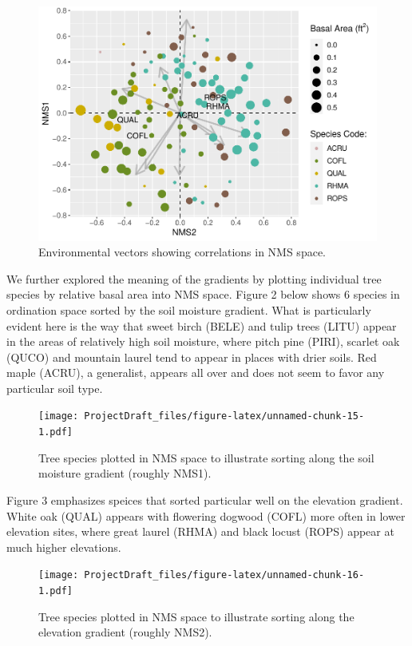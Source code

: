 \documentclass[
  12pt,
]{article}
\begin{document}
\begin{figure}
\centering
\includegraphics{ProjectDraft_files/figure-latex/unnamed-chunk-14-1.pdf}
\caption{Environmental vectors showing correlations in NMS space.}
\end{figure}

We further explored the meaning of the gradients by plotting individual
tree species by relative basal area into NMS space. Figure 2 below shows
6 species in ordination space sorted by the soil moisture gradient. What
is particularly evident here is the way that sweet birch (BELE) and
tulip trees (LITU) appear in the areas of relatively high soil moisture,
where pitch pine (PIRI), scarlet oak (QUCO) and mountain laurel tend to
appear in places with drier soils. Red maple (ACRU), a generalist,
appears all over and does not seem to favor any particular soil type.

\begin{figure}
\centering
\texttt{[image: ProjectDraft\_files/figure-latex/unnamed-chunk-15-1.pdf]}
\caption{Tree species plotted in NMS space to illustrate sorting along
the soil moisture gradient (roughly NMS1).}
\end{figure}

Figure 3 emphasizes speices that sorted particular well on the elevation
gradient. White oak (QUAL) appears with flowering dogwood (COFL) more
often in lower elevation sites, where great laurel (RHMA) and black
locust (ROPS) appear at much higher elevations.

\begin{figure}
\centering
\texttt{[image: ProjectDraft\_files/figure-latex/unnamed-chunk-16-1.pdf]}
\caption{Tree species plotted in NMS space to illustrate sorting along
the elevation gradient (roughly NMS2).}
\end{figure}
\end{document}
